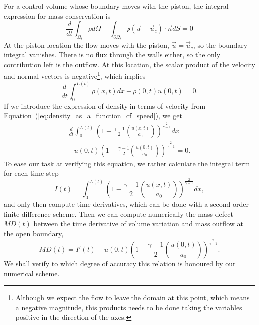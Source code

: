 \documentclass[../../thesis.tex]{subfiles}
\newcommand{\dt}{\ensuremath{\Delta t}}
\begin{document}
For a control volume whose boundary moves with the piston, 
the integral expression for mass conservation is
\begin{equation}
    \frac{d}{dt}\int_{\Omega_t} \rho d\Omega 
    + \int_{\partial\Omega_t} \rho \left(\vec{u} - \vec{u}_c\right) \cdot \vec{n} dS = 0
\end{equation}
At the piston location the flow moves with the piston, $\vec{u} = \vec{u}_c$, 
so the boundary integral vanishes. 
There is no flux through the walls either, so the only contribution left is the outflow.
At this location, the scalar product of the velocity and normal vectors is 
negative\footnote{Although we expect the flow to leave the domain at this point, 
which means a negative magnitude, this products needs to be done taking 
the variables positive in the direction of the axes.}, which implies
\begin{equation}
    \frac{d}{dt}\int_{0}^{L(t)} \rho(x,t) dx - \rho(0,t) u(0,t) = 0.
    \label{eq:integral_mass_conservation}
\end{equation}
If we introduce the expression of density in terms of velocity from 
Equation~(\ref{eq:density_as_a_function_of_speed}), we get
\begin{equation}
\begin{split}
        \frac{d}{dt}\int_{0}^{L(t)} \left(1 - \frac{\gamma-1}{2}\left(\frac{u(x,t)}{a_0}\right)\right)^{\frac{2}{\gamma-1}} dx 
        \\
        - u(0,t) \left(1 - \frac{\gamma-1}{2}\left(\frac{u(0,t)}{a_0}\right)\right)^{\frac{2}{\gamma-1}}  = 0.
\end{split}
\end{equation}
To ease our task at verifying this equation, we rather calculate the integral term for each time step
\begin{equation}
    I(t) = \int_{0}^{L(t)} \left(1 - \frac{\gamma-1}{2}\left(\frac{u(x,t)}{a_0}\right)\right)^{\frac{2}{\gamma-1}} dx,
\end{equation}
and only then compute time derivatives, which can be done with a second order finite difference scheme.
Then we can compute numerically the mass defect $MD(t)$ between the time derivative of volume variation
and mass outflow at the open boundary,
\begin{equation}
    MD(t) = I'(t) - u(0,t) \left(1 - \frac{\gamma-1}{2}\left(\frac{u(0,t)}{a_0}\right)\right)^{\frac{2}{\gamma-1}}.
    \label{eq:mass_conservation_check}
\end{equation}
We shall verify to which degree of accuracy this relation is honoured by our numerical scheme.
\end{document}
